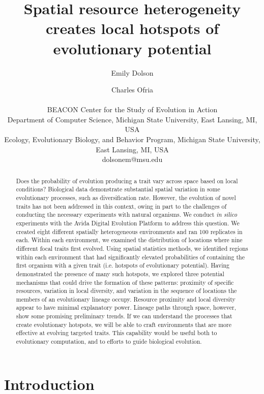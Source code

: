 \documentclass[letterpaper]{article}
\title{Spatial resource heterogeneity creates local hotspots of evolutionary potential}
\author{Emily Dolson \and Charles Ofria \\
\mbox{}\\
BEACON Center for the Study of Evolution in Action \\
Department of Computer Science, Michigan State University, East Lansing, MI, USA \\
Ecology, Evolutionary Biology, and Behavior Program, Michigan State University, East Lansing, MI, USA \\
dolsonem@msu.edu} %
\begin{document}
\maketitle

\begin{abstract}
Does the probability of evolution producing a trait vary across space based on local conditions? Biological data demonstrate substantial spatial variation in some evolutionary processes, such as diversification rate. However, the evolution of novel traits has not been addressed in this context, owing in part to the challenges of conducting the necessary experiments with natural organisms. We conduct \textit{in silico} experiments with the Avida Digital Evolution Platform to address this question. We created eight different spatially heterogeneous environments and ran 100 replicates in each.  Within each environment, we examined the distribution of locations where nine different focal traits first evolved. Using spatial statistics methods, we identified regions within each environment that had significantly elevated probabilities of containing the first organism with a given trait (i.e. hotspots of evolutionary potential). Having demonstrated the presence of many such hotspots, we explored three potential mechanisms that could drive the formation of these patterns: proximity of specific resources, variation in local diversity, and variation in the sequence of locations the members of an evolutionary lineage occupy. Resource proximity and local diversity appear to have minimal explanatory power. Lineage paths through space, however, show some promising preliminary trends. If we can understand the processes that create evolutionary hotspots, we will be able to craft environments that are more effective at evolving targeted traits. This capability would be useful both to evolutionary computation, and to efforts to guide biological evolution.

\end{abstract}
\section{Introduction}
\end{document}
